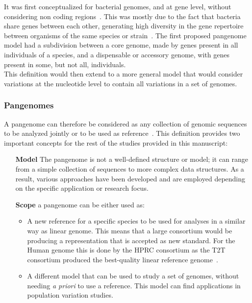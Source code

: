 It was first conceptualized for bacterial genomes, and at gene level, without considering non coding regions~\cite{bact_pg, pandora}. This was mostly due to the fact that bacteria share genes between each other, generating high diversity in the gene repertoire between organisms of the same species or strain~\cite{pandora}.
The first proposed pangenome model had a subdivision between a core genome, made by genes present in all individuals of a species, and a dispensable or accessory genome, with genes present in some, but not all, individuals.\\
This definition would then extend to a more general model that would consider variations at the nucleotide level to contain all variations in a set of genomes.

\subsubsection{Pangenomes}
A pangenome can therefore be considered as any collection of genomic sequences to be analyzed jointly or to be used as reference~\cite{cpmarshall,drafthpg}. This definition provides two important concepts for the rest of the studies provided in this manuscript: 
\begin{itemize}
	\item[\textbf{Model}] The pangenome is not a well-defined structure or model; it can range from a simple collection of sequences to more complex data structures. As a result, various approaches have been developed and are employed depending on the specific application or research focus.
	\item[\textbf{Scope}] a pangenome can be either used as:
	\begin{itemize}
		\item A new reference for a specific species to be used for analyses in a similar way as linear genome. This means that a large consortium would be producing a representation that is accepted as new standard. For the Human genome this is done by the HPRC consortium as the T2T consortium produced the best-quality linear reference genome~\cite{t2t}.
		\item A different model that can be used to study a set of genomes, without needing \emph{a priori} to use a reference. This model can find applications in population variation studies. 
	\end{itemize} 
\end{itemize}

